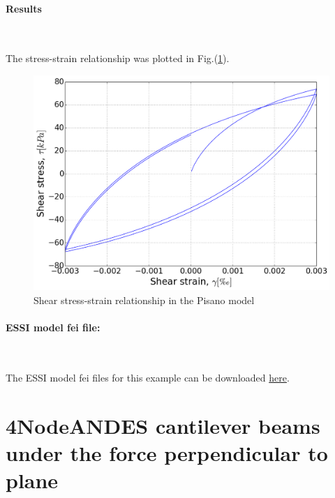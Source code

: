 \documentclass[fleqn,11pt]{article}
\begin{document}
\newpage
\paragraph{Results} ~

The stress-strain relationship was plotted in Fig.(\ref{fig Shear stress-strain relationship in the Pisano model}). 

\begin{figure}[H]
  \centering
  \includegraphics[width=12cm]{../Figure-files/pisanoLT_test01.png}
  \caption{Shear stress-strain relationship in the Pisano model}
  \label{fig Shear stress-strain relationship in the Pisano model}
\end{figure}

\paragraph{ESSI model fei file: } ~



The ESSI model fei files for this example can be downloaded \href{https://github.com/yuan-energy/Real-ESSI-Examples/blob/master/model_fei_file/shearbeam_pisano_plastic/shearbeam_pisano_plastic.tgz?raw=true}{here}.









\newpage
\section{4NodeANDES cantilever beams under the force perpendicular to plane}
\end{document}
